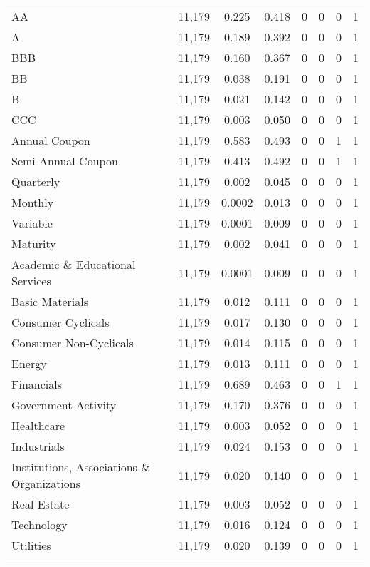 \begin{table}[!htbp]
\begin{tabular}{@{\extracolsep{5pt}}lccccccc}
AA & 11,179 & 0.225 & 0.418 & 0 & 0 & 0 & 1 \\ 
A & 11,179 & 0.189 & 0.392 & 0 & 0 & 0 & 1 \\ 
BBB & 11,179 & 0.160 & 0.367 & 0 & 0 & 0 & 1 \\ 
BB & 11,179 & 0.038 & 0.191 & 0 & 0 & 0 & 1 \\ 
B & 11,179 & 0.021 & 0.142 & 0 & 0 & 0 & 1 \\ 
CCC & 11,179 & 0.003 & 0.050 & 0 & 0 & 0 & 1 \\ 
Annual Coupon & 11,179 & 0.583 & 0.493 & 0 & 0 & 1 & 1 \\ 
Semi Annual Coupon & 11,179 & 0.413 & 0.492 & 0 & 0 & 1 & 1 \\ 
Quarterly & 11,179 & 0.002 & 0.045 & 0 & 0 & 0 & 1 \\ 
Monthly & 11,179 & 0.0002 & 0.013 & 0 & 0 & 0 & 1 \\ 
Variable & 11,179 & 0.0001 & 0.009 & 0 & 0 & 0 & 1 \\ 
Maturity & 11,179 & 0.002 & 0.041 & 0 & 0 & 0 & 1 \\ 
Academic \& Educational Services & 11,179 & 0.0001 & 0.009 & 0 & 0 & 0 & 1 \\ 
Basic Materials & 11,179 & 0.012 & 0.111 & 0 & 0 & 0 & 1 \\ 
Consumer Cyclicals & 11,179 & 0.017 & 0.130 & 0 & 0 & 0 & 1 \\ 
Consumer Non-Cyclicals & 11,179 & 0.014 & 0.115 & 0 & 0 & 0 & 1 \\ 
Energy & 11,179 & 0.013 & 0.111 & 0 & 0 & 0 & 1 \\ 
Financials & 11,179 & 0.689 & 0.463 & 0 & 0 & 1 & 1 \\ 
Government Activity & 11,179 & 0.170 & 0.376 & 0 & 0 & 0 & 1 \\ 
Healthcare & 11,179 & 0.003 & 0.052 & 0 & 0 & 0 & 1 \\ 
Industrials & 11,179 & 0.024 & 0.153 & 0 & 0 & 0 & 1 \\ 
Institutions, Associations \& Organizations & 11,179 & 0.020 & 0.140 & 0 & 0 & 0 & 1 \\ 
Real Estate & 11,179 & 0.003 & 0.052 & 0 & 0 & 0 & 1 \\ 
Technology & 11,179 & 0.016 & 0.124 & 0 & 0 & 0 & 1 \\ 
Utilities & 11,179 & 0.020 & 0.139 & 0 & 0 & 0 & 1 \\ 
\hline \\[-1.8ex] 
\end{tabular} 
\end{table} 

